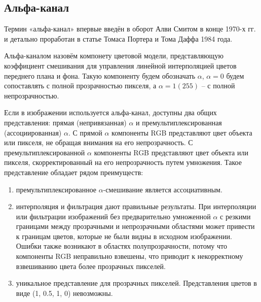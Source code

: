 \begin{figure}[ht!]
\end{figure}

\subsection{Альфа-канал}
Термин «альфа-канал» впервые введён в оборот Алви Смитом в конце 1970-х гг. и детально проработан в статье Томаса Портера и Тома Даффа 1984 года.

Альфа-каналом назовём компонету цветовой модели, представляющую коэффициент смешивания для управления линейной интерполяцией цветов переднего плана и фона. Такую компоненту будем обозначать $\alpha$, $\alpha = 0$ будем сопоставлять с полной прозрачностью пикселя, а $\alpha=1 (255)$ -- с полной непрозрачностью. \cite{bib7} 

Если в изображении используется альфа-канал, доступны два общих представления: прямая (непривязанная) $\alpha$ и премультиплексированная (ассоциированная) $\alpha$. С прямой $\alpha$ компоненты RGB представляют цвет объекта или пикселя, не обращая внимания на его непрозрачность. С премультиплексированной $\alpha$ компоненты RGB представляют цвет объекта или пикселя, скорректированный на его непрозрачность путем умножения. Такое представление обладает рядом преимуществ: 
\begin{enumerate}
	\item премультиплексированное $\alpha$-смешивание является ассоциативным.
	\item интерполяция и фильтрация дают правильные результаты. При интерполяции или фильтрации изображений без предварительно умноженной $\alpha$ с резкими границами между прозрачными и непрозрачными областями  может привести к границам цветов, которые не были видны в исходном изображении. Ошибки также возникают в областях полупрозрачности, потому что компоненты RGB неправильно взвешены, что приводит к некорректному взвешиванию цвета более прозрачных пикселей.
	\item уникальное представление для прозрачных пикселей. Представления цветов в виде (1, 0.5, 1, 0) невозможны.
\end{enumerate}


